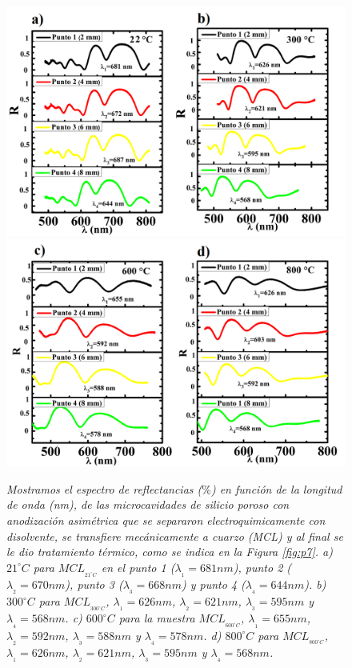\documentclass[a4paper,11pt,]{book}
\begin{document}
\begin{figure}[H]
	\centering
	\includegraphics[scale=.25]{../Images/pl1}
	\includegraphics[scale=.25]{../Images/pl2}
	\caption{\emph{Mostramos el espectro de reflectancias ($\%$) en función de la longitud de onda (nm), de las microcavidades de silicio poroso con anodización asimétrica que se separaron electroquimicamente con disolvente,  se transfiere mecánicamente a cuarzo (MCL) y al final se le dio tratamiento térmico, como se indica en la Figura \ref{fig:p7}. a)  $21 ^{\circ} C$ para $MCL_{_{21^{\circ} C}}$ en el punto 1 ($\lambda_{_{1}}=681 nm$), punto 2 ($\lambda_{_{2}}=670 nm$), punto 3 ($\lambda_{_{3}}=668 nm$) y punto 4 ($\lambda_{_{4}}=644 nm$). b) $300^{\circ} C$ para $MCL_{_{300^{\circ} C}}$, $\lambda_{_{1}}=626 nm$,  $\lambda_{_{2}}=621 nm$,  $\lambda_{_{3}}=595 nm$ y $\lambda_{_{4}}=568 nm$. c) $600^{\circ} C$ para la muestra $MCL_{_{600^{\circ} C}}$, $\lambda_{_{1}}=655 nm$,  $\lambda_{_{2}}=592 nm$,  $\lambda_{_{3}}=588 nm$ y  $\lambda_{_{4}}=578 nm$. d) $800^{\circ} C$ para  $MCL_{_{800^{\circ} C}}$, $\lambda_{_{1}}=626 nm$, $\lambda_{_{2}}=621 nm$,  $\lambda_{_{3}}=595 nm$ y $\lambda_{_{4}}=568 nm$. }}
	\label{fig:p8}
\end{figure}
\end{document}

